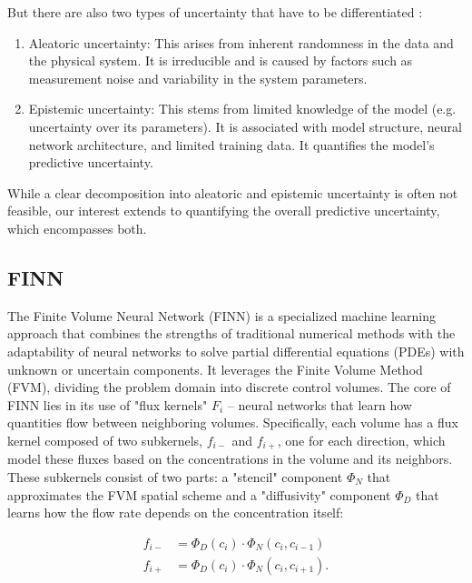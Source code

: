 But there are also two types of uncertainty that have to be differentiated \cite{depeweg2018decomposition, gawlikowski2023survey}:

\begin{enumerate}
    \item Aleatoric uncertainty: This arises from inherent randomness in the data and the physical system. It is irreducible and is caused by factors such as measurement noise and variability in the system parameters.
    \item Epistemic uncertainty: This stems from limited knowledge of the model (e.g. uncertainty over its parameters). It is associated with model structure, neural network architecture, and limited training data. It quantifies the model's predictive uncertainty.
\end{enumerate}

While a clear decomposition into aleatoric and epistemic uncertainty is often not feasible, our interest extends to quantifying the overall predictive uncertainty, which encompasses both.


\subsection{FINN}

The Finite Volume Neural Network (FINN) is a specialized machine learning approach that combines the strengths of traditional numerical methods with the adaptability of neural networks to solve partial differential equations (PDEs) with unknown or uncertain components. It leverages the Finite Volume Method (FVM), dividing the problem domain into discrete control volumes. The core of FINN lies in its use of "flux kernels" $F_i$ – neural networks that learn how quantities flow between neighboring volumes. Specifically, each volume has a flux kernel composed of two subkernels, $f_{i-}$ and $f_{i+}$, one for each direction, which model these fluxes based on the concentrations in the volume and its neighbors. These subkernels consist of two parts: a "stencil" component $\Phi_N$ that approximates the FVM spatial scheme and a "diffusivity" component $\Phi_D$ that learns how the flow rate depends on the concentration itself:

\begin{align*}
    f_{i-} &= \Phi_D(c_i) \cdot \Phi_N(c_i, c_{i-1}) \\
    f_{i+} &= \Phi_D(c_i) \cdot \Phi_N(c_i, c_{i+1}).
\end{align*}

